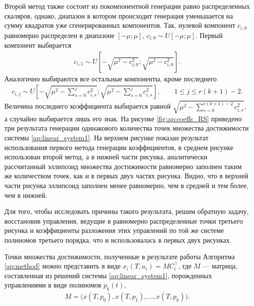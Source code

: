 \documentclass[../main.tex]{subfiles}
\begin{document}
  Второй метод также состоит из покомпонентной генерации равно распределенных скаляров, однако, диапазон в котором происходит генерация уменьшается на сумму квадратов уже сгенерированных компонентов.   
  Так, нулевой компонент $c_{i, 0}$ равномерно распределен в диапазоне $[-\mu; \mu]$, $c_{i, 0} \sim U[-\mu; \mu]$. 
  Первый компонент выбирается 
  \begin{gather*}
  	 c_{i, 1} \sim U\left[-\sqrt{\mu^2 - c_{i, 0}^2}; \sqrt{\mu^2 - c_{i, 0}^2}\right].
  \end{gather*} 
  Аналогично выбираются все остальные компоненты, кроме последнего
    \begin{gather*}
  	c_{i, j} \sim U\left[-\sqrt{\mu^2 - \sum\limits_{s = 0}^j c_{i, s}^2}; \sqrt{\mu^2 - \sum\limits_{s = 0}^j c_{i, s}^2}\right], \qquad 1 \leqslant j \leqslant r(k+1) - 2.
  \end{gather*} 
  Величина последнего коэффициента выбирается равной $\sqrt{\mu^2 - \sum\limits_{s = 0}^{r(k+1) - 2} c_{i, s}^2} $, а случайно выбирается лишь его знак.
  На рисунке \ref{fig:ap:coeffs_RS} приведено три результата генерации одинакового количества точек множества достижимости системы \eqref{ap:linear_system1}.
  На верхнем рисунке показан результат использования первого метода генерации коэффициентов, в среднем рисунке использован второй метод, а в нижней части рисунка, аналитически рассчитанный эллипсоид множества достижимости равномерно заполнен таким же количеством точек, как и в первых двух частях рисунка. 
  Видно, что в верхней части рисунка эллипсоид заполнен менее равномерно, чем в средней и тем более, чем в нижней. 
  
  Для того, чтобы исследовать причины такого результата, решим обратную задачу, восстановив управления, ведущие в равномерно распределенные точки третьего рисунка и коэффициенты разложения этих управлений по той же системе полиномов третьего порядка, что и использовалась в первых двух рисунках.
  
  Точки множества достижимости, полученные в результате работы Алгоритма \ref{ap:method} можно представить в виде $x_i(T, u_i) = M C_i^{\top}$, где $M$ --- матрица, составленная из решений системы \eqref{ap:linear_system1}, порожденных управлениями в виде полиномов $p_k(t)$, 
  \begin{gather}
  	 M = \big(x(T, p_0), x(T, p_1), \dots, x(T, p_k)\big).
  \end{gather} 
  
\end{document}

